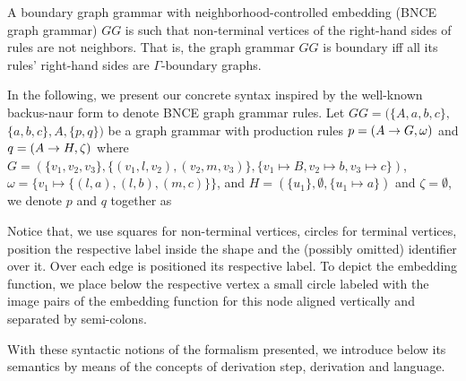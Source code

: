 \documentclass[]{report}
\begin{document}
\begin{definition}
	A boundary graph grammar with neighborhood-controlled embedding (BNCE graph grammar) $GG$ is such that non-terminal vertices of the right-hand sides of rules are not neighbors. That is, the graph grammar $GG$ is boundary iff all its rules' right-hand sides are $\Gamma\text{-boundary}$ graphs.
\end{definition}


In the following, we present our concrete syntax inspired by the well-known backus-naur form to denote BNCE graph grammar rules. Let $GG = (\{A,a,b,c\},$ $\{a,b,c\}, A, \{p,q\})$ be a graph grammar with production rules $p = (A \to G,\omega)$ and $q = (A \to H,\zeta)$ where $G = (\{v_1, v_2, v_3\}, \{(v_1,l,v_2), (v_2,m,v_3)\}, \{v_1 \mapsto B, v_2 \mapsto b, v_3 \mapsto c \})$, $\omega = \{v_1 \mapsto \{(l,a), (l,b), (m,c)\}\}$, and $H = (\{u_1\}, \emptyset, \{u_1 \mapsto a\})$ and $\zeta = \emptyset$, we denote $p$ and $q$ together as\\

\noindent


Notice that, we use squares for non-terminal vertices, circles for terminal vertices, position the respective label inside the shape and the (possibly omitted) identifier over it. Over each edge is positioned its respective label. To depict the embedding function, we place below the respective vertex a small circle labeled with the image pairs of the embedding function for this node aligned vertically and separated by semi-colons.

With these syntactic notions of the formalism presented, we introduce below its semantics by means of the concepts of derivation step, derivation and language.
\end{document}
